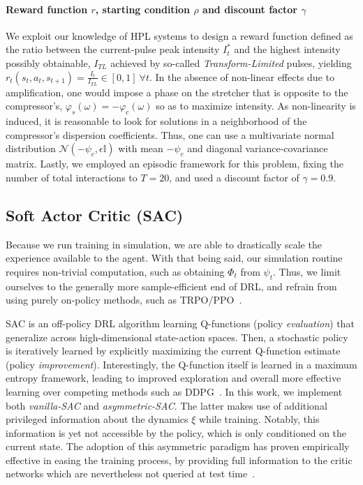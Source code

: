 \paragraph{Reward function \( r \), starting condition \( \rho \) and discount factor \( \gamma \)}
We exploit our knowledge of HPL systems to design a reward function defined as the ratio between the current-pulse peak intensity \( I_t^* \) and the highest intensity possibly obtainable, \( I_{TL} \) achieved by so-called \emph{Transform-Limited} pulses, yielding \(r_t(s_t, a_t, s_{t+1}) = \frac{I_t}{I_{TL}} \in [0,1] \ \forall t \). In the absence of non-linear effects due to amplification, one would impose a phase on the stretcher that is opposite to the compressor's, \( \varphi_s(\omega) = - \varphi_c(\omega) \) so as to maximize intensity. As non-linearity is induced, it is reasonable to look for solutions in a neighborhood of the compressor's dispersion coefficients. Thus, one can use a multivariate normal distribution \( \mathcal N(-\psi_c, \epsilon \mathbb I) \) with mean \( -\psi_c \) and diagonal variance-covariance matrix. Lastly, we employed an episodic framework for this problem, fixing the number of total interactions to \( T=20 \), and used a discount factor of \( \gamma=0.9 \).

\subsection{Soft Actor Critic (SAC)}
Because we run training in simulation, we are able to drastically scale the experience available to the agent. With that being said, our simulation routine requires non-trivial computation, such as obtaining \( \Phi_t \) from \( \psi_t \). Thus, we limit ourselves to the generally more sample-efficient end of DRL, and refrain from using purely on-policy methods, such as TRPO/PPO~\citep{schulman2015trust, schulman2017proximal}.

SAC is an off-policy DRL algorithm learning Q-functions (policy \textit{evaluation}) that generalize across high-dimensional state-action spaces. Then, a stochastic policy is iteratively learned by explicitly maximizing the current Q-function estimate (policy \textit{improvement}). 
Interestingly, the Q-function itself is learned in a maximum entropy framework, leading to improved exploration and overall more effective learning over competing methods such as DDPG~\citep{haarnoja2018soft}. In this work, we implement both \emph{vanilla-SAC} and \emph{asymmetric-SAC}. The latter makes use of additional privileged information about the dynamics \( \xi \) while training. Notably, this information is yet not accessible by the policy, which is only conditioned on the current state.
The adoption of this asymmetric paradigm has proven empirically effective in easing the training process, by providing full information to the critic networks which are nevertheless not queried at test time~\citep{akkaya2019solving}.

